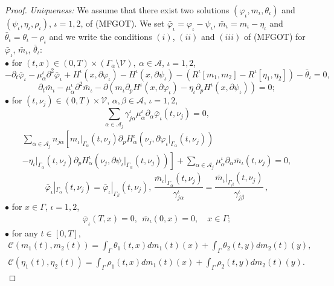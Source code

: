 \documentclass[smallextended,referee,envcountsect,]{svjour3}
\newcommand{\G}{\Gamma}
\newcommand{\cA}{{\mathcal A}}
\newcommand{\cC}{{\mathcal C}}
\newcommand{\cV}{{\mathcal V}}
\renewcommand{\phi}{\varphi}
\renewcommand{\a}{{\alpha}}
\renewcommand{\b}{{\beta}}
\renewcommand{\th}{\theta}
\begin{document}
\begin{proof}
\vskip 12pt
	{\it Uniqueness:}  We assume that there exist two solutions $(\phi_\iota, m_\iota, \theta_\iota)$ and  $(\psi_\iota, \eta_\iota, \rho_\iota)$, $\iota=1, 2$, of {(MFGOT)}. We set $\bar\phi_\iota=\phi_\iota-\psi_\iota$, $\bar m_\iota=m_\iota-\eta_\iota$ and $\bar \theta_\iota=\theta_\iota-\rho_\iota$ and we write the conditions $(i)$, $(ii)$ and $(iii)$ of {(MFGOT)} for $\bar\phi_\iota$, $\bar m_\iota$, $\bar \theta_\iota$:\\
$\bullet$ for $(t, x)\in (0, T)\times(\Gamma_{\a}\setminus\cV),\ \a\in\cA$, $\iota=1,2$,
$$-\partial_t\bar\phi_\iota-\mu^\iota_{\a}\partial^2\bar\phi_\iota+H^\iota(x, \partial\phi_\iota)-H^\iota(x, \partial\psi_\iota)-(R^\iota[m_1, m_2]-R^\iota[\eta_1, \eta_2])- \bar\theta_\iota=0, $$
$$\partial_t\bar m_\iota-\mu^\iota_{\a}\partial^2\bar m_\iota-\partial(m_\iota\partial_pH^\iota(x, \partial\phi_\iota)-\eta_\iota\partial_pH^\iota(x, \partial\psi_\iota))=0;$$
$\bullet$ for $(t, \nu_j)\in (0, T)\times\cV$, $\a,\b\in\cA$, $\iota=1,2$,
$$ \sum_{\a\in\cA_j}\gamma^\iota_{j\a}\mu^\iota_{\a}\partial_{\a}\bar\phi_\iota(t, \nu_j)=0,$$
\begin{multline*}
\sum_{\a\in\cA_j}n_{j\a}\left[m_\iota|_{\Gamma_{\a}}(t, \nu_j)\partial_{p}H_\a^\iota\left(\nu_j, \partial\phi_\iota|_{\Gamma_{\a}}(t, \nu_j)\right)\right.\\
\left.-\eta_\iota|_{\Gamma_{\a}}(t, \nu_j)\partial_pH_\a^\iota\left(\nu_j, \partial\psi_\iota|_{\Gamma_{\a}}(t, \nu_j)\right)\right]+\sum_{\a\in\cA_j}\mu^\iota_{\a}\partial_{\a}\bar m_\iota(t, \nu_j)=0,
  \end{multline*}
$$\bar\phi_\iota|_{\Gamma_{\a}}(t, \nu_j)=\bar\phi_\iota|_{\Gamma_{\beta}}(t, \nu_j), \,\frac{\bar m_\iota|_{\Gamma_{\a}}(t, \nu_j)}{\gamma^\iota_{j\a}}=\frac{\bar m_\iota|_{\Gamma_\beta}(t, \nu_j)}{\gamma^\iota_{j\beta}}\, ,$$
 $\bullet$ for $x\in\Gamma$, $\iota=1,2$,
\begin{align*}
	\bar\phi_\iota(T, x)=0, \ \ \bar m_\iota(0, x)=0,\quad x\in\G;
\end{align*}
$\bullet$ for any $t\in [0,T]$,
\begin{align*} 
	 \cC(m_1(t), m_2(t))=\int_{\Gamma}\th_1(t, x)dm_1(t)(x)+\int_{\Gamma}\th_2(t, y)dm_2(t)(y) ,\\
	 \cC(\eta_1(t), \eta_2(t))=\int_{\Gamma}\rho_1(t, x)dm_1(t)(x)+\int_{\Gamma}\rho_2(t, y)dm_2(t)(y).
\end{align*}

\end{proof}
\end{document}
